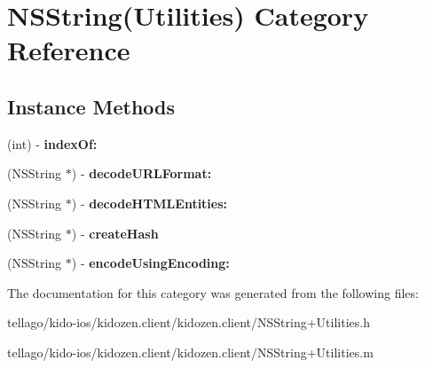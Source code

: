 \hypertarget{category_n_s_string_07_utilities_08}{\section{N\-S\-String(Utilities) Category Reference}
\label{category_n_s_string_07_utilities_08}
}
\subsection*{Instance Methods}
\begin{DoxyCompactItemize}
\item 
\hypertarget{category_n_s_string_07_utilities_08_aa3b42d6b7dd509488410e2c958a7a910}{(int) -\/ {\bfseries index\-Of\-:}}\label{category_n_s_string_07_utilities_08_aa3b42d6b7dd509488410e2c958a7a910}

\item 
\hypertarget{category_n_s_string_07_utilities_08_a78e6e54f42116284bec5f5e4b5a0aa40}{(N\-S\-String $\ast$) -\/ {\bfseries decode\-U\-R\-L\-Format\-:}}\label{category_n_s_string_07_utilities_08_a78e6e54f42116284bec5f5e4b5a0aa40}

\item 
\hypertarget{category_n_s_string_07_utilities_08_a70f6113027320e3c0b7074baa024a787}{(N\-S\-String $\ast$) -\/ {\bfseries decode\-H\-T\-M\-L\-Entities\-:}}\label{category_n_s_string_07_utilities_08_a70f6113027320e3c0b7074baa024a787}

\item 
\hypertarget{category_n_s_string_07_utilities_08_acb0557555ad9c07078df818fede74e1a}{(N\-S\-String $\ast$) -\/ {\bfseries create\-Hash}}\label{category_n_s_string_07_utilities_08_acb0557555ad9c07078df818fede74e1a}

\item 
\hypertarget{category_n_s_string_07_utilities_08_a13e3cbc20a32cf49c47cea4feedaefc2}{(N\-S\-String $\ast$) -\/ {\bfseries encode\-Using\-Encoding\-:}}\label{category_n_s_string_07_utilities_08_a13e3cbc20a32cf49c47cea4feedaefc2}

\end{DoxyCompactItemize}


The documentation for this category was generated from the following files\-:\begin{DoxyCompactItemize}
\item 
tellago/kido-\/ios/kidozen.\-client/kidozen.\-client/N\-S\-String+\-Utilities.\-h\item 
tellago/kido-\/ios/kidozen.\-client/kidozen.\-client/N\-S\-String+\-Utilities.\-m\end{DoxyCompactItemize}
